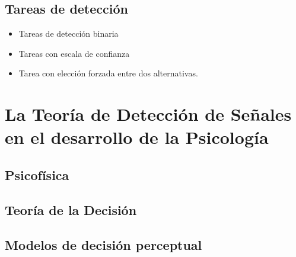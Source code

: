 
\subsection{Tareas de detección}

\begin{itemize}
\item Tareas de detección binaria 
\item Tareas con escala de confianza
\item Tarea con elección forzada entre dos alternativas.
\end{itemize}

\section{La Teoría de Detección de Señales en el desarrollo de la Psicología}

\subsection{Psicofísica}



\subsection{Teoría de la Decisión}

\subsection{Modelos de decisión perceptual}


